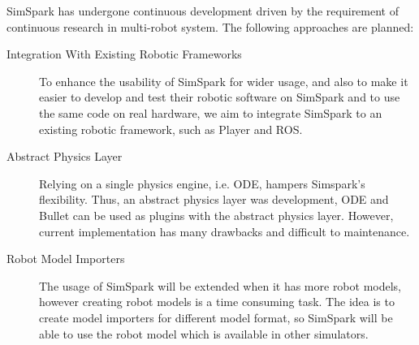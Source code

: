 \documentclass{llncs}
\begin{document}
SimSpark has undergone continuous development driven by the requirement of continuous research in multi-robot system. The following approaches are planned:
\begin{description}
\item[Integration With Existing Robotic Frameworks] 
To enhance the usability of SimSpark for wider usage, and also to make it easier to develop and test their robotic software on SimSpark and to
use the same code on real hardware, we aim to integrate SimSpark to an 
existing robotic framework, such as Player and ROS.




\item[Abstract Physics Layer]
Relying on a single physics engine, i.e. ODE, hampers Simspark's flexibility.
Thus, an abstract physics layer was development\cite{Held2010}, ODE and Bullet can be used as plugins with the abstract physics layer. However, current implementation has many drawbacks and difficult to maintenance.

\item[Robot Model Importers]
The usage of SimSpark will be extended when it has more robot models, however creating robot models is a time consuming task. The idea is to create model importers for different model format, so SimSpark will be able to use the robot model which is available in other simulators.
\end{description}
\end{document}
